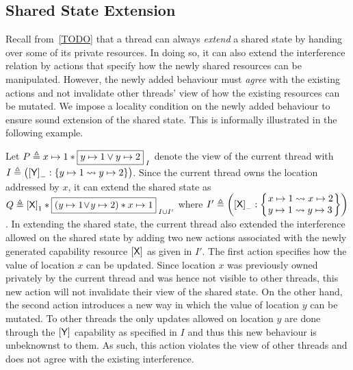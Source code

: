 \subsection{Shared State Extension}\label{subsec:extension}
Recall from~\ref{TODO} that a thread can always \emph{extend} a shared state by handing over some of its private resources. In doing so, it can also extend the interference relation by actions that specify how the newly shared resources can be manipulated. However, the newly added behaviour must \emph{agree} with the existing actions and not invalidate other threads' view of how the existing resources can be mutated. We impose a locality condition on the newly added behaviour to ensure sound extension of the shared state. This is informally illustrated in the following example. 
%
\begin{example}\label{ex:badExtension}
Let $P \triangleq x \mapsto 1 * \boxed{y \mapsto 1 \lor y \mapsto 2}_{\; I}$ denote the view of the current thread with $I \triangleq \left(\left[\textsf{Y}\right]_{-}: \left\{y \mapsto 1 \rightsquigarrow y \mapsto 2\right\} \right)$. Since the current thread owns the location addressed by $x$, it can extend the shared state as $Q \triangleq \left[\textsf{X}\right]_{1} * \boxed{\left(y \mapsto 1 \!\lor\! y \mapsto 2 \right) * x \mapsto 1}_{\; I \cup I'}$ where 
$
	I' \eqdef 
		\left(
			\token{X}{-}: 
			\left\{
			\hspace*{-0.15cm}
			\begin{array}{l} 
				\cell{x}{1} \swap \cell{x}{2}\\
				\cell{y}{1} \swap \cell{y}{3}
			\end{array}
			\hspace*{-0.15cm}
			\right\}
		 \right)
$.
In extending the shared state, the current thread also extended the interference allowed on the shared state by adding two new actions associated with the newly generated capability resource $\left[\textsf{X}\right]_{}$ as given in $I'$. The first action specifies how the value of location $x$ can be updated. Since location $x$ was previously owned privately by the current thread and was hence not visible to other threads, this new action will not invalidate their view of the shared state. On the other hand, the second action introduces a new way in which the value of location $y$ can be mutated. To other threads the only updates allowed on location $y$ are done through the $\left[\textsf{Y}\right]_{}$ capability as specified in $I$ and thus this new behaviour is unbeknownst to them. As such, this action violates the view of other threads and does not agree with the existing interference.
\end{example}
